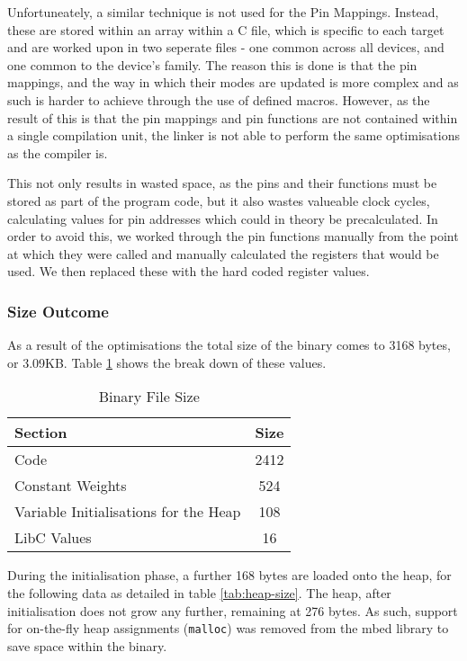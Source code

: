 Unfortuneately, a similar technique is not used for the Pin Mappings. Instead, these are stored within an array within a C file, which is specific to each target and are worked upon in two seperate files - one common across all devices, and one common to the device's family. The reason this is done is that the pin mappings, and the way in which their modes are updated is more complex and as such is harder to achieve through the use of defined macros. However, as the result of this is that the pin mappings and pin functions are not contained within a single compilation unit, the linker is not able to perform the same optimisations as the compiler is.

This not only results in wasted space, as the pins and their functions must be stored as part of the program code, but it also wastes valueable clock cycles, calculating values for pin addresses which could in theory be precalculated. In order to avoid this, we worked through the pin functions manually from the point at which they were called and manually calculated the registers that would be used. We then replaced these with the hard coded register values.

\subsubsection{Size Outcome}

As a result of the optimisations the total size of the binary comes to 3168 bytes, or 3.09KB. Table \ref{tab:prog-size} shows the break down of these values.

\begin{table}[]
    \centering
    \begin{tabular}{|l|c|}
        \hline
        Section & Size \\
        \hline
        Code & 2412 \\
        Constant Weights & 524 \\
        Variable Initialisations for the Heap & 108 \\
        LibC Values & 16 \\
        \hline
    \end{tabular}
    \caption{Binary File Size \label{tab:prog-size}}
\end{table}

During the initialisation phase, a further 168 bytes are loaded onto the heap, for the following data as detailed in table \ref{tab:heap-size}. The heap, after initialisation does not grow any further, remaining at 276 bytes. As such, support for on-the-fly heap assignments (\verb|malloc|) was removed from the mbed library to save space within the binary.

